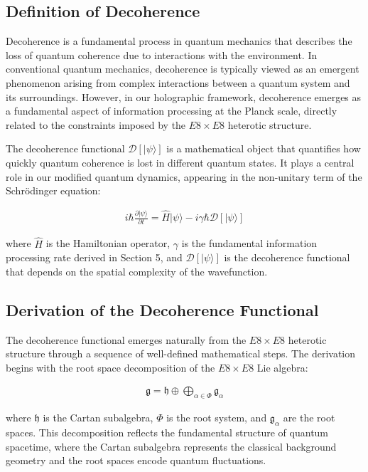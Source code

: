 \documentclass[11pt,english,twoside]{article}
\begin{document}
\subsection{Definition of Decoherence}

Decoherence is a fundamental process in quantum mechanics that describes the loss of quantum coherence due to interactions with the environment. In conventional quantum mechanics, decoherence is typically viewed as an emergent phenomenon arising from complex interactions between a quantum system and its surroundings. However, in our holographic framework, decoherence emerges as a fundamental aspect of information processing at the Planck scale, directly related to the constraints imposed by the $E8\times E8$ heterotic structure.

The decoherence functional $\mathcal{D}[|\psi\rangle]$ is a mathematical object that quantifies how quickly quantum coherence is lost in different quantum states. It plays a central role in our modified quantum dynamics, appearing in the non-unitary term of the Schrödinger equation:

\begin{align}
    i\hbar \frac{\partial |\psi\rangle}{\partial t} = \hat{H}|\psi\rangle - i\gamma\hbar \mathcal{D}[|\psi\rangle]
\end{align}

where $\hat{H}$ is the Hamiltonian operator, $\gamma$ is the fundamental information processing rate derived in Section 5, and $\mathcal{D}[|\psi\rangle]$ is the decoherence functional that depends on the spatial complexity of the wavefunction.

\subsection{Derivation of the Decoherence Functional}

The decoherence functional emerges naturally from the $E8\times E8$ heterotic structure through a sequence of well-defined mathematical steps. The derivation begins with the root space decomposition of the $E8\times E8$ Lie algebra:

\begin{align}
    \mathfrak{g} = \mathfrak{h} \oplus \bigoplus_{\alpha \in \Phi} \mathfrak{g}_\alpha
\end{align}

where $\mathfrak{h}$ is the Cartan subalgebra, $\Phi$ is the root system, and $\mathfrak{g}_\alpha$ are the root spaces. This decomposition reflects the fundamental structure of quantum spacetime, where the Cartan subalgebra represents the classical background geometry and the root spaces encode quantum fluctuations.
\end{document}
